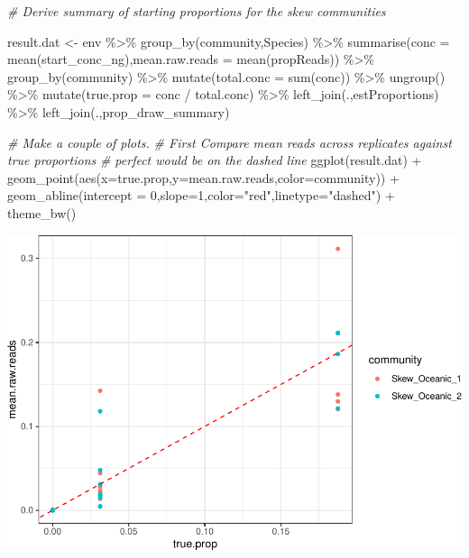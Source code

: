 \documentclass[
]{article}
\newenvironment{Shaded}{\begin{snugshade}}{\end{snugshade}}
\newcommand{\AttributeTok}[1]{\textcolor[rgb]{0.77,0.63,0.00}{#1}}
\newcommand{\CommentTok}[1]{\textcolor[rgb]{0.56,0.35,0.01}{\textit{#1}}}
\newcommand{\DecValTok}[1]{\textcolor[rgb]{0.00,0.00,0.81}{#1}}
\newcommand{\FunctionTok}[1]{\textcolor[rgb]{0.00,0.00,0.00}{#1}}
\newcommand{\NormalTok}[1]{#1}
\newcommand{\OtherTok}[1]{\textcolor[rgb]{0.56,0.35,0.01}{#1}}
\newcommand{\SpecialCharTok}[1]{\textcolor[rgb]{0.00,0.00,0.00}{#1}}
\newcommand{\StringTok}[1]{\textcolor[rgb]{0.31,0.60,0.02}{#1}}
\begin{document}
\begin{Shaded}
\begin{Highlighting}[]
\CommentTok{\# Derive summary of starting proportions for the skew communities}

\NormalTok{result.dat }\OtherTok{\textless{}{-}}\NormalTok{ env }\SpecialCharTok{\%\textgreater{}\%} \FunctionTok{group\_by}\NormalTok{(community,Species) }\SpecialCharTok{\%\textgreater{}\%}
                  \FunctionTok{summarise}\NormalTok{(}\AttributeTok{conc =} \FunctionTok{mean}\NormalTok{(start\_conc\_ng),}\AttributeTok{mean.raw.reads =} \FunctionTok{mean}\NormalTok{(propReads)) }\SpecialCharTok{\%\textgreater{}\%}
                  \FunctionTok{group\_by}\NormalTok{(community) }\SpecialCharTok{\%\textgreater{}\%}
                  \FunctionTok{mutate}\NormalTok{(}\AttributeTok{total.conc =} \FunctionTok{sum}\NormalTok{(conc)) }\SpecialCharTok{\%\textgreater{}\%}
                  \FunctionTok{ungroup}\NormalTok{() }\SpecialCharTok{\%\textgreater{}\%}
                  \FunctionTok{mutate}\NormalTok{(}\AttributeTok{true.prop =}\NormalTok{ conc }\SpecialCharTok{/}\NormalTok{ total.conc) }\SpecialCharTok{\%\textgreater{}\%}
                  \FunctionTok{left\_join}\NormalTok{(.,estProportions) }\SpecialCharTok{\%\textgreater{}\%}
                  \FunctionTok{left\_join}\NormalTok{(.,prop\_draw\_summary)}

\CommentTok{\# Make a couple of plots. }
\CommentTok{\# First Compare mean reads across replicates against true proportions}
\CommentTok{\# perfect would be on the dashed line}
\FunctionTok{ggplot}\NormalTok{(result.dat) }\SpecialCharTok{+}
    \FunctionTok{geom\_point}\NormalTok{(}\FunctionTok{aes}\NormalTok{(}\AttributeTok{x=}\NormalTok{true.prop,}\AttributeTok{y=}\NormalTok{mean.raw.reads,}\AttributeTok{color=}\NormalTok{community)) }\SpecialCharTok{+}
    \FunctionTok{geom\_abline}\NormalTok{(}\AttributeTok{intercept =} \DecValTok{0}\NormalTok{,}\AttributeTok{slope=}\DecValTok{1}\NormalTok{,}\AttributeTok{color=}\StringTok{"red"}\NormalTok{,}\AttributeTok{linetype=}\StringTok{"dashed"}\NormalTok{) }\SpecialCharTok{+}
    \FunctionTok{theme\_bw}\NormalTok{()}
\end{Highlighting}
\end{Shaded}

\includegraphics{Appendix-S4_files/figure-latex/stan_plots-1.pdf}
\end{document}
